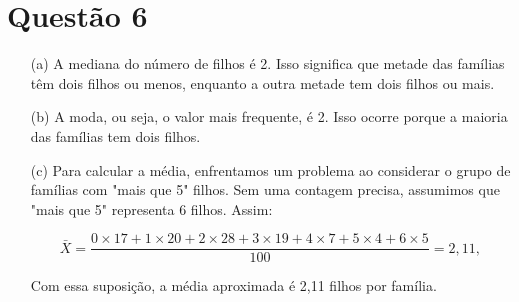 \documentclass{article}
\begin{document}
\section*{Questão 6}

\begin{enumerate}
    \item[(a)] A mediana do número de filhos é 2. Isso significa que metade das famílias têm dois filhos ou menos, enquanto a outra metade tem dois filhos ou mais.
    
    \item[(b)] A moda, ou seja, o valor mais frequente, é 2. Isso ocorre porque a maioria das famílias tem dois filhos.
    
    \item[(c)] Para calcular a média, enfrentamos um problema ao considerar o grupo de famílias com "mais que 5" filhos. Sem uma contagem precisa, assumimos que "mais que 5" representa 6 filhos. Assim:
    
    
    \[
    \bar{X} = \frac{0 \times 17 + 1 \times 20 + 2 \times 28 + 3 \times 19 + 4 \times 7 + 5 \times 4 + 6 \times 5}{100} = 2,11,
    \]
    
     Com essa suposição, a média aproximada é 2,11 filhos por família.
\end{enumerate}
\end{document}
